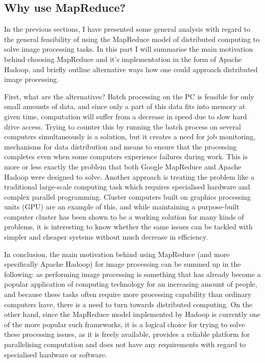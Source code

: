\documentclass [12pt,a4paper]{report}
\begin{document}
\subsection{Why use MapReduce?}

In the previous sections, I have presented some general analysis with regard to the general feasibility of using the MapReduce model of distributed computing to solve image processing tasks. In this part I will summarise the main motivation behind choosing MapReduce and it's implementation in the form of Apache Hadoop, and briefly outline alternative ways how one could approach distributed image processing.

First, what are the alternatives? Batch processing on the PC is feasible for only small amounts of data, and since only a part of this data fits into memory at given time, computation will suffer from a decrease in speed due to slow hard drive access. Trying to counter this by running the batch process on several computers simultaneously is a solution, but it creates a need for job monitoring, mechanisms for data distribution and means to ensure that the processing completes even when some computers experience failures during work. This is more or less exactly the problem that both Google MapReduce and Apache Hadoop were designed to solve. Another approach is treating the problem like a traditional large-scale computing task which requires specialised hardware and complex parallel programming. Cluster computers built on graphics processing units (GPU) are an example of this, and while maintaining a purpose-built computer cluster has been shown to be a working solution for many kinds of problems, it is interesting to know whether the same issues can be tackled with simpler and cheaper systems without much decrease in efficiency.

In conclusion, the main motivation behind using MapReduce (and more specifically Apache Hadoop) for image processing can be summed up in the following: as performing image processing is something that has already become a popular application of computing technology for an increasing amount of people, and because these tasks often require more processing capability than ordinary computers have, there is a need to turn towards distributed computing. On the other hand, since the MapReduce model implemented by Hadoop is currently one of the more popular such frameworks, it is a logical choice for trying to solve these processing issues, as it is freely available, provides a reliable platform for parallelising computation and does not have any requirements with regard to specialised hardware or software.
\end{document}

